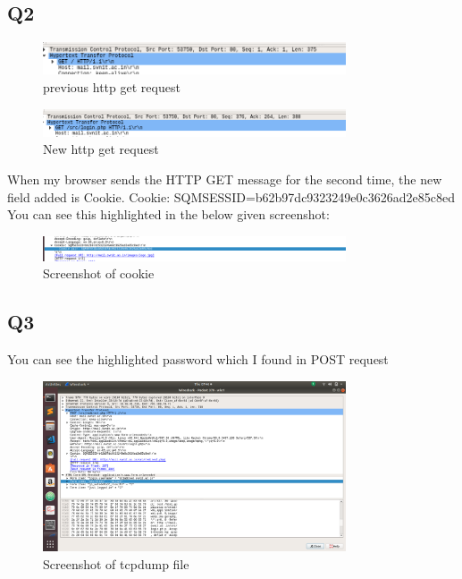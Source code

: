 \documentclass{article}
\begin{document}
\subsection{Q2}

 \begin{figure}[H]
 \centering
 \includegraphics[width=0.8\textwidth]{../Set5/q2/a.png}
 \caption{\label{fig:PING}previous http get request}
 \end{figure}
 
  \begin{figure}[H]
 \centering
 \includegraphics[width=0.8\textwidth]{../Set5/q2/b.png}
 \caption{\label{fig:PING}New http get request}
 \end{figure}

When my browser sends the HTTP GET message for the second time, the new
field added is Cookie. Cookie: SQMSESSID=b62b97dc9323249e0c3626ad2e85c8ed
You can see this highlighted in the below given screenshot: \\
 

 \begin{figure}[H]
 \centering
 \includegraphics[width=0.8\textwidth]{../Set5/q2/c.png}
 \caption{\label{fig:PING}Screenshot of cookie}
 \end{figure}

\subsection{Q3}
You can see the highlighted password which I found in POST request \\
 \begin{figure}[H]
 \centering
 \includegraphics[width=0.8\textwidth]{../Set5/q3/a.png}
 \caption{\label{fig:PING}Screenshot of tcpdump file}
 \end{figure}
\end{document}
